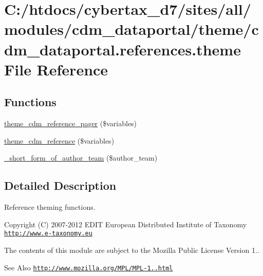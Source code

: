 \hypertarget{cdm__dataportal_8references_8theme}{\section{C\-:/htdocs/cybertax\-\_\-d7/sites/all/modules/cdm\-\_\-dataportal/theme/cdm\-\_\-dataportal.references.\-theme File Reference}
\label{cdm__dataportal_8references_8theme}
}
\subsection*{Functions}
\begin{DoxyCompactItemize}
\item 
\hyperlink{cdm__dataportal_8references_8theme_a606c743daf0c97bc636dd27b21cf3751}{theme\-\_\-cdm\-\_\-reference\-\_\-pager} (\$variables)
\item 
\hyperlink{cdm__dataportal_8references_8theme_a73e323534b6d5f4aa41b131bc8bd4a0e}{theme\-\_\-cdm\-\_\-reference} (\$variables)
\item 
\hyperlink{cdm__dataportal_8references_8theme_ab25a33a878685df7e8c37f7c5d967681}{\-\_\-short\-\_\-form\-\_\-of\-\_\-author\-\_\-team} (\$author\-\_\-team)
\end{DoxyCompactItemize}


\subsection{Detailed Description}
Reference theming functions.

\begin{DoxyCopyright}{Copyright}
(C) 2007-\/2012 E\-D\-I\-T European Distributed Institute of Taxonomy \href{http://www.e-taxonomy.eu}{\tt http\-://www.\-e-\/taxonomy.\-eu}
\end{DoxyCopyright}
The contents of this module are subject to the Mozilla Public License Version 1.. \begin{DoxySeeAlso}{See Also}
\href{http://www.mozilla.org/MPL/MPL-1.1.html}{\tt http\-://www.\-mozilla.\-org/\-M\-P\-L/\-M\-P\-L-\/1..\-html} 
\end{DoxySeeAlso}


